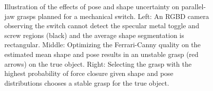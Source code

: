 \documentclass[journal,transmag]{IEEEtran}%
\begin{document}
  
   

\begin{figure}%
    \centering
   
    \caption{ Illustration of the effects of pose and shape uncertainty on parallel-jaw grasps planned for a mechanical switch. Left: An RGBD camera observing the switch cannot detect the specular metal toggle and screw regions (black) and the average shape segmentation is rectangular. Middle: Optimizing the Ferrari-Canny quality on the estimated mean shape and pose results in an unstable grasp (red arrows) on the true object. Right: Selecting the grasp with the highest probability of force closure given shape and pose distributions chooses a stable grasp for the true object.  }%
    \label{fig:motivation}%
\end{figure}
\end{document}
